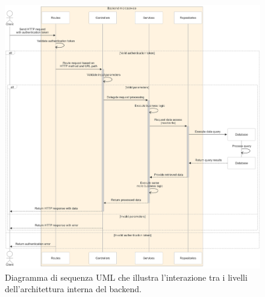 \begin{figure}
  \centering
  \includegraphics[width=1\textwidth]{figures/microservice-internal-interactions.png}
  \caption{Diagramma di sequenza UML che illustra l'interazione tra i livelli dell'architettura interna del backend.}
  \label{fig:microservice-internal-interactions}
\end{figure}

